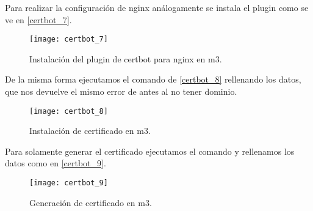 Para realizar la configuración de nginx análogamente se instala el plugin como se ve en \eqref{certbot_7}.

\begin{figure}[h!]
\begin{center}
\caption{Instalación del plugin de certbot para nginx en m3.}
\label{certbot_7}
\texttt{[image: certbot\_7]}
\end{center}
\end{figure}

De la misma forma ejecutamos el comando de \eqref{certbot_8} rellenando los datos, que nos devuelve el mismo error de antes al no tener dominio.

\begin{figure}[h!]
\begin{center}
\caption{Instalación de certificado en m3.}
\label{certbot_8}
\texttt{[image: certbot\_8]}
\end{center}
\end{figure}

Para solamente generar el certificado ejecutamos el comando y rellenamos los datos como en \eqref{certbot_9}.

\begin{figure}[h!]
\begin{center}
\caption{Generación de certificado en m3.}
\label{certbot_9}
\texttt{[image: certbot\_9]}
\end{center}
\end{figure}


